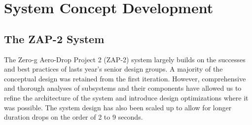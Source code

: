 \section{System Concept Development}

\subsection{The ZAP-2 System}

\indent\indent The Zero-g Aero-Drop Project 2 (ZAP-2) system largely builds on the successes and best practices of lasts year's senior design groups. A majority of the conceptual design was retained from the first iteration. However, comprehensive and thorough analyses of subsystems and their components have allowed us to refine the architecture of the system and introduce design optimizations where it was possible. The system design has also been scaled up to allow for longer duration drops on the order of 2 to 9 seconds.

